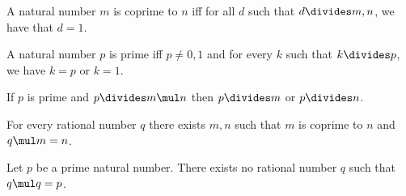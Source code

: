 \begin{definition}
  A natural number $m$ is coprime to $n$ iff for all $d$ such that
  $d\divides m, n$, we have that $d = 1$.
\end{definition}

\begin{definition}
  A natural number $p$ is prime iff $p\neq 0,1$ and for every $k$
  such that $k\divides p$, we have $k = p$ or $k = 1$.
\end{definition}

\begin{theorem}
  If $p$ is prime and $p\divides m\mul n$
  then $p\divides m$ or $p\divides n$.
\end{theorem}

\begin{theorem}
  For every rational number $q$ there exists $m, n$
  such that $m$ is coprime to $n$ and $q\mul m = n$.
\end{theorem}

\begin{theorem}
  Let $p$ be a prime natural number.
  There exists no rational number $q$
  such that $q\mul q = p$.
\end{theorem}

